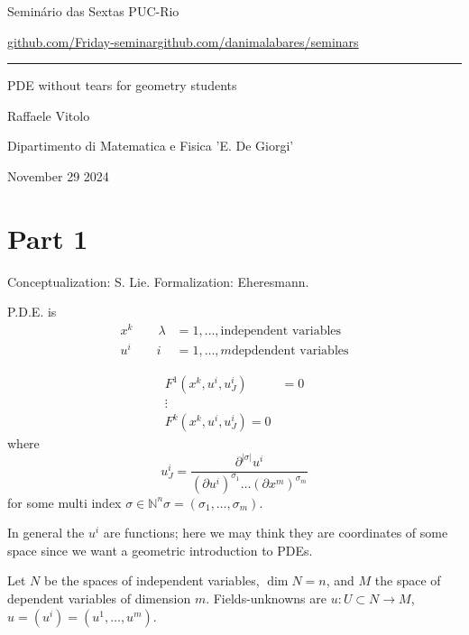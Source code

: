 


\begin{minipage}{\textwidth}
	\begin{minipage}{1\textwidth}
		Semin\'ario das Sextas \hfill PUC-Rio
		
		{\small\href{https://github.com/Friday-seminar/}{github.com/Friday-seminar}\hfill\href{https://github.com/danimalabares/seminars}{github.com/danimalabares/seminars}}
		\end{minipage}
\end{minipage}\vspace{.2cm}\hrule

\vspace{10pt}

{\Huge PDE without tears for geometry students}


\hfill{\Large Raffaele Vitolo}

\hfill{\Large Dipartimento di Matematica e Fisica 'E. De Giorgi'}

\hfill{\large November 29 2024}

\section{Part 1}

Conceptualization: S. Lie. Formalization: Eheresmann.

P.D.E. is 
\begin{align*}
x^k \qquad \lambda&=1,\ldots,\text{independent variables} \\
u^i\qquad i&=1,\ldots,m \text{depdendent variables} 
\end{align*}

\begin{align*}
F^1(x^k,u^i,u^i_J)&=0\\
\vdots \\
F^k(x^k,u^i,u^i_J)=0
\end{align*}
where
\[u^i_J=\frac{\partial^{|\sigma|}u^i}{(\partial u^i)^{\sigma_1}\ldots(\partial x^m)^{\sigma_m}}\]
for some multi index $\sigma \in \mathbb{N}^n\sigma=(\sigma_1,\ldots,\sigma_m)$.

In general the $u^i$ are functions; here we may think they are coordinates of some space since we want a geometric introduction to PDEs.

Let $N$ be the spaces of independent variables, $\dim N=n$, and  $M$ the space of dependent variables of dimension $m$. Fields-unknowns are $u:U \subset N \to M$, $u=(u^i)=(u^1,\ldots,u^m)$.

